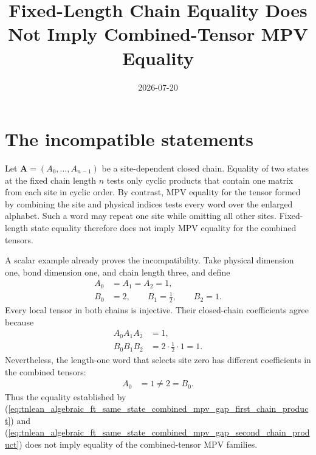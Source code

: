 \documentclass{article}
\title{Fixed-Length Chain Equality Does Not Imply Combined-Tensor MPV Equality}
\author{}
\date{2026-07-20}
\begin{document}
\maketitle
{}

\section{The incompatible statements}

Let $\mathbf A=(A_0,\ldots,A_{n-1})$ be a site-dependent closed chain. Equality
of two states at the fixed chain length $n$ tests only cyclic products that
contain one matrix from each site in cyclic order. By contrast, MPV equality
for the tensor formed by combining the site and physical indices tests every
word over the enlarged alphabet. Such a word may repeat one site while
omitting all other sites. Fixed-length state equality therefore does not imply
MPV equality for the combined tensors.

A scalar example already proves the incompatibility. Take physical dimension
one, bond dimension one, and chain length three, and define
\begin{align}
    A_0
        &=
        A_1
        =
        A_2
        =
        1,
    \label{eq:tnlean_algebraic_ft_same_state_combined_mpv_gap_first_chain}\\
    B_0
        &=
        2,
    \qquad
    B_1
        =
        \frac{1}{2},
    \qquad
    B_2
        =
        1.
    \label{eq:tnlean_algebraic_ft_same_state_combined_mpv_gap_second_chain}
\end{align}
Every local tensor in both chains is injective. Their closed-chain
coefficients agree because
\begin{align}
    A_0A_1A_2
        &=
        1,
    \label{eq:tnlean_algebraic_ft_same_state_combined_mpv_gap_first_chain_product}\\
    B_0B_1B_2
        &=
        2\cdot\frac{1}{2}\cdot 1
        =
        1.
    \label{eq:tnlean_algebraic_ft_same_state_combined_mpv_gap_second_chain_product}
\end{align}
Nevertheless, the length-one word that selects site zero has different
coefficients in the combined tensors:
\begin{align}
    A_0
        &=
        1
        \neq
        2
        =
        B_0.
    \label{eq:tnlean_algebraic_ft_same_state_combined_mpv_gap_length_one_mismatch}
\end{align}
Thus the equality established by
(\ref{eq:tnlean_algebraic_ft_same_state_combined_mpv_gap_first_chain_product})
and
(\ref{eq:tnlean_algebraic_ft_same_state_combined_mpv_gap_second_chain_product})
does not imply equality of the combined-tensor MPV families.
\end{document}
